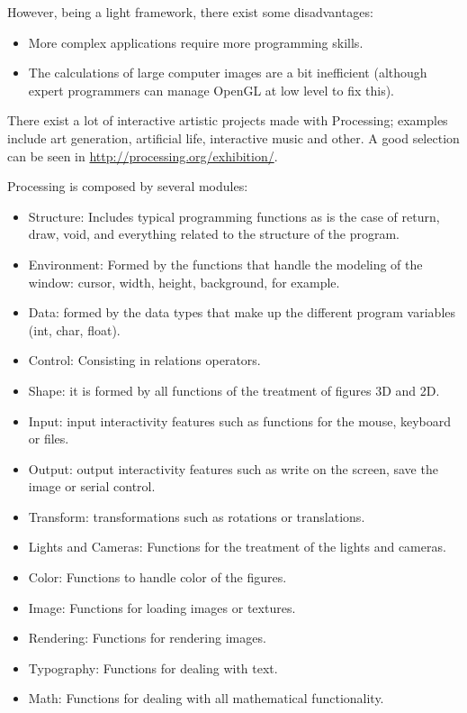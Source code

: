 \documentclass[conference]{IEEEtran}
\begin{document}
However, being a light framework, there exist some disadvantages:
\begin{itemize}
\item More complex applications require more programming skills.
\item The calculations of large computer images are a bit inefficient (although expert programmers can manage OpenGL at low level to fix this).
\end{itemize}

There exist a lot of interactive artistic projects made with Processing; examples include art generation, artificial life, interactive music and other. A good selection can be seen in \url{http://processing.org/exhibition/}.

Processing is composed by several modules:

\begin{itemize}
\item Structure: Includes typical programming functions as is the case of return, draw, void, and everything related to the structure of the program.
\item Environment: Formed by the functions that handle the modeling of the window: cursor, width, height, background, for example.
\item Data: formed by the data types that make up the different program variables (int, char, float).
\item Control: Consisting in relations operators.
\item Shape: it is formed by all functions of the treatment of figures 3D and 2D.
\item Input: input interactivity features such as functions for the mouse, keyboard or files.
\item Output: output interactivity features such as write on the screen, save the image or serial control.
\item Transform: transformations such as rotations or translations.
\item Lights and Cameras: Functions for the treatment of the lights and cameras.
\item Color: Functions to handle color of the figures.
\item Image: Functions for loading images or textures.
\item Rendering: Functions for rendering images.
\item Typography: Functions for dealing with text.
\item Math: Functions for dealing with all mathematical functionality.
\end{itemize}
\end{document}
